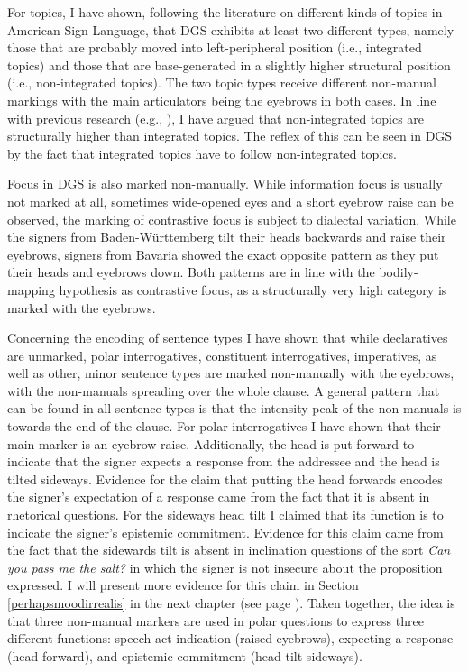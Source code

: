 For topics, I have shown, following the literature on different kinds of topics in American Sign Language, that DGS exhibits at least two different types, namely those that are probably moved into left-peripheral position (i.e., integrated topics) and those that are base-generated in a slightly higher structural position (i.e., non-integrated topics). The two topic types receive different non-manual markings with the main articulators being the eyebrows in both cases. In line with previous research (e.g., \citealt{benincapol2004topic}), I have argued that non-integrated topics are structurally higher than integrated topics. The reflex of this can be seen in DGS by the fact that integrated topics have to follow non-integrated topics.

Focus in DGS is also marked non-manually. While information focus is usually not marked at all, sometimes wide-opened eyes and a short eyebrow raise can be observed, the marking of contrastive focus is subject to dialectal variation. While the signers from Baden-Württemberg tilt their heads backwards and raise their eyebrows, signers from Bavaria showed the exact opposite pattern as they put their heads and eyebrows down. Both patterns are in line with the bodily-mapping hypothesis as contrastive focus, as a structurally very high category is marked with the eyebrows. 

\largerpage
Concerning the encoding of sentence types I have shown that while declaratives are unmarked, polar interrogatives, constituent interrogatives, imperatives, as well as other, minor sentence types are marked non-manually with the eyebrows, with the non-manuals spreading over the whole clause. A general pattern that can be found in all sentence types is that the intensity peak of the non-manuals is towards the end of the clause. For polar interrogatives I have shown that their main marker is an eyebrow raise. Additionally, the head is put forward to indicate that the signer expects a response from the addressee and the head is tilted sideways. Evidence for the claim that putting the head forwards encodes the signer's expectation of a response came from the fact that it is absent in rhetorical questions. For the sideways head tilt I claimed that its function is to indicate the signer's epistemic commitment. Evidence for this claim came from the fact that the sidewards tilt is absent in inclination questions of the sort \textit{Can you pass me the salt?} in which the signer is not insecure about the proposition expressed. I will present more evidence for this claim in Section \ref{perhapsmoodirrealis} in the next chapter (see page \pageref{perhapsmoodirrealis}). Taken together, the idea is that three non-manual markers are used in polar questions to express three different functions: speech-act indication (raised eyebrows), expecting a response (head forward), and epistemic commitment (head tilt sideways). 

